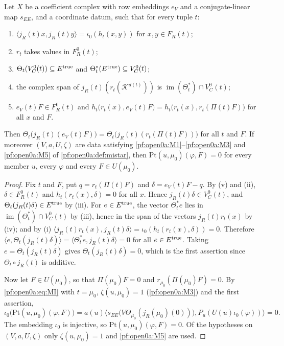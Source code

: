 \begin{lemma}\label{pf:open0:btv}
Let $X$ be a coefficient complex with row embeddings $e_V$ and a conjugate-linear map $s_{EE}$, and a coordinate datum, such that
for every tuple $t$:
\begin{enumerate}[label=(\roman*)]
\item $\langle j_R(t)x,j_R(t)y\rangle=\iota_0(h_t(x,y))$ for $x,y\in F_R(t)$;
\item $r_t$ takes values in $F^0_R(t)$;
\item $\Theta_t(V^0_C(t))\subseteq E^{\mathrm{true}}$ and $\Theta_t^*(E^{\mathrm{true}})\subseteq V^0_C(t)$;
\item the complex span of $j_R(t)(r_t(\mathcal K^{d(t)}))$ is $\operatorname{im}(\Theta_t^*)\cap V^0_C(t)$;
\item $e_V(t)F\in F^0_R(t)$ and $h_t\bigl(r_t(x),e_V(t)F\bigr)=h_t\bigl(r_t(x),r_t(\Pi(t)F)\bigr)$ for all $x$ and $F$.
\end{enumerate}
Then $\Theta_t\bigl(j_R(t)(e_V(t)F)\bigr)=\Theta_t\bigl(j_R(t)(r_t(\Pi(t)F))\bigr)$ for all $t$ and $F$. If moreover $(V,a,U,\zeta)$ are data
satisfying \ref{pf:open0a:M1}--\ref{pf:open0a:M3} and \ref{pf:open0a:M5} of \cref{pf:open0a:def:mistar}, then
$\mathrm{Pt}(u,\mu_0)(\varphi,F)=0$ for every member $u$, every $\varphi$ and every $F\in U(\mu_0)$.
\ 
\end{lemma}

\begin{proof}
Fix $t$ and $F$, put $q=r_t(\Pi(t)F)$ and $\delta=e_V(t)F-q$. By (v) and (ii), $\delta\in F^0_R(t)$ and $h_t(r_t(x),\delta)=0$ for all $x$.
Hence $j_R(t)\delta\in V^0_C(t)$, and $\Theta_t(j_R(t)\delta)\in E^{\mathrm{true}}$ by (iii). For $e\in E^{\mathrm{true}}$, the vector $\Theta_t^*e$ lies in
$\operatorname{im}(\Theta_t^*)\cap V^0_C(t)$ by (iii), hence in the span of the vectors $j_R(t)r_t(x)$ by (iv); and by (i)
$\langle j_R(t)r_t(x),j_R(t)\delta\rangle=\iota_0(h_t(r_t(x),\delta))=0$. Therefore
$\langle e,\Theta_t(j_R(t)\delta)\rangle=\langle\Theta_t^*e,j_R(t)\delta\rangle=0$ for all $e\in E^{\mathrm{true}}$. Taking
$e=\Theta_t(j_R(t)\delta)$ gives $\Theta_t(j_R(t)\delta)=0$, which is the first assertion since $\Theta_t\circ j_R(t)$ is additive.

Now let $F\in U(\mu_0)$, so that $\Pi(\mu_0)F=0$ and $r_{\mu_0}(\Pi(\mu_0)F)=0$. By \eqref{pf:open0a:eq:MI} with $t=\mu_0$,
$\zeta(u,\mu_0)=1$ (\ref{pf:open0a:M3}) and the first assertion,
\[
\iota_0\bigl(\mathrm{Pt}(u,\mu_0)(\varphi,F)\bigr)=a(u)\bigl\langle s_{EE}\bigl(V\Theta_{\mu_0}(j_R(\mu_0)(0))\bigr),
P_u(U(u)\iota_0(\varphi))\bigr\rangle=0 .
\]
The embedding $\iota_0$ is injective, so $\mathrm{Pt}(u,\mu_0)(\varphi,F)=0$. Of the hypotheses on $(V,a,U,\zeta)$ only
$\zeta(u,\mu_0)=1$ and \ref{pf:open0a:M5} are used.
\end{proof}

